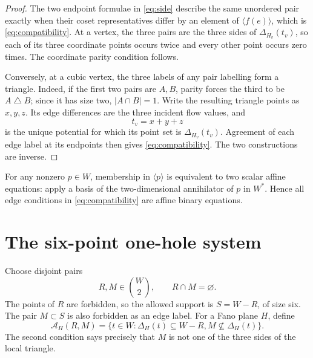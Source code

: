 \documentclass[11pt]{article}
\theoremstyle{definition}
\theoremstyle{remark}
\newcommand{\A}{\mathcal A}
\numberwithin{equation}{section}
\begin{document}
\begin{proof}
The two endpoint formulae in \eqref{eq:side} describe the same unordered
pair exactly when their coset representatives differ by an element of
\(\langle f(e)\rangle\), which is \eqref{eq:compatibility}.  At a vertex,
the three pairs are the three sides of \(\Delta_{H_v}(t_v)\), so each of
its three coordinate points occurs twice and every other point occurs
zero times.  The coordinate parity condition follows.

Conversely, at a cubic vertex, the three labels of any pair labelling
form a triangle.  Indeed, if the first two pairs are \(A,B\), parity
forces the third to be \(A\mathbin{\triangle}B\); since it has size two,
\(|A\cap B|=1\).  Write the resulting triangle points as \(x,y,z\).
Its edge differences are the three incident flow values, and
\[
                              t_v=x+y+z
\]
is the unique potential for which its point set is
\(\Delta_{H_v}(t_v)\).  Agreement of each edge label at its endpoints
then gives \eqref{eq:compatibility}.  The two constructions are inverse.
\end{proof}

For any nonzero \(p\in W\), membership in \(\langle p\rangle\) is
equivalent to two scalar affine equations: apply a basis of the
two-dimensional annihilator of \(p\) in \(W^*\).  Hence all edge
conditions in \eqref{eq:compatibility} are affine binary equations.

\section{The six-point one-hole system}

Choose disjoint pairs
\begin{equation}
                         R,M\in\binom W2,\qquad R\cap M=\varnothing.
                         \label{eq:pairs}
\end{equation}
The points of \(R\) are forbidden, so the allowed support is
\(S=W-R\), of size six.  The pair \(M\subset S\) is also forbidden as
an edge label.  For a Fano plane \(H\), define
\begin{equation}
 \A_H(R,M)=
 \{t\in W:\Delta_H(t)\subseteq W-R,
                 M\nsubseteq\Delta_H(t)\}.
 \label{eq:local-list}
\end{equation}
The second condition says precisely that \(M\) is not one of the three
sides of the local triangle.
\end{document}
